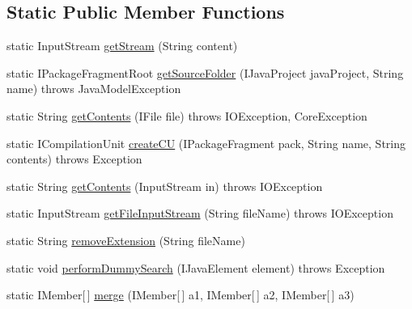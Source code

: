 \subsection*{Static Public Member Functions}
\begin{DoxyCompactItemize}
\item 
static InputStream \hyperlink{classorg_1_1eclipse_1_1jdt_1_1ui_1_1tests_1_1refactoring_1_1infra_1_1RefactoringTest_a2422208077d0b23be1396d756033b0d6}{getStream} (String content)
\item 
static IPackageFragmentRoot \hyperlink{classorg_1_1eclipse_1_1jdt_1_1ui_1_1tests_1_1refactoring_1_1infra_1_1RefactoringTest_ae3cb05763a0363d83579a39902a55abf}{getSourceFolder} (IJavaProject javaProject, String name)  throws JavaModelException
\item 
static String \hyperlink{classorg_1_1eclipse_1_1jdt_1_1ui_1_1tests_1_1refactoring_1_1infra_1_1RefactoringTest_a8b48cfbd8502c44a36892c4d288eaf9c}{getContents} (IFile file)  throws IOException, CoreException 
\item 
static ICompilationUnit \hyperlink{classorg_1_1eclipse_1_1jdt_1_1ui_1_1tests_1_1refactoring_1_1infra_1_1RefactoringTest_a2aadf695e3542df1a6c4c8321bab4a65}{createCU} (IPackageFragment pack, String name, String contents)  throws Exception 
\item 
static String \hyperlink{classorg_1_1eclipse_1_1jdt_1_1ui_1_1tests_1_1refactoring_1_1infra_1_1RefactoringTest_a44674d045b34748096e93d2f30aea2b7}{getContents} (InputStream in)  throws IOException 
\item 
static InputStream \hyperlink{classorg_1_1eclipse_1_1jdt_1_1ui_1_1tests_1_1refactoring_1_1infra_1_1RefactoringTest_a8814073699e290159a5b0b9091eef6ef}{getFileInputStream} (String fileName)  throws IOException 
\item 
static String \hyperlink{classorg_1_1eclipse_1_1jdt_1_1ui_1_1tests_1_1refactoring_1_1infra_1_1RefactoringTest_a8868c73767cf4655e0a1e8c20f8b32b3}{removeExtension} (String fileName)
\item 
static void \hyperlink{classorg_1_1eclipse_1_1jdt_1_1ui_1_1tests_1_1refactoring_1_1infra_1_1RefactoringTest_a1152ec42802bc5f65f6dde85d2a29b47}{performDummySearch} (IJavaElement element)  throws Exception
\item 
static IMember\mbox{[}$\,$\mbox{]} \hyperlink{classorg_1_1eclipse_1_1jdt_1_1ui_1_1tests_1_1refactoring_1_1infra_1_1RefactoringTest_a01ee1018948999df15b40bc0a3e28ec3}{merge} (IMember\mbox{[}$\,$\mbox{]} a1, IMember\mbox{[}$\,$\mbox{]} a2, IMember\mbox{[}$\,$\mbox{]} a3)

\end{DoxyCompactItemize}
